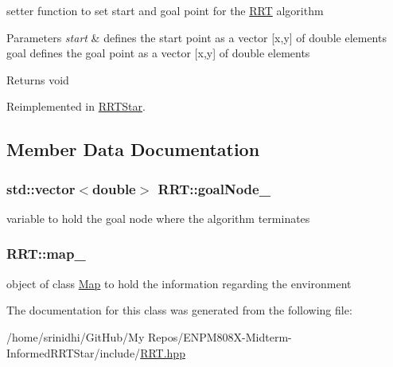 setter function to set start and goal point for the \hyperlink{classRRT}{R\+RT} algorithm 


\begin{DoxyParams}{Parameters}
{\em start} & defines the start point as a vector \mbox{[}x,y\mbox{]} of double elements goal defines the goal point as a vector \mbox{[}x,y\mbox{]} of double elements \\
\hline
\end{DoxyParams}
\begin{DoxyReturn}{Returns}
void 
\end{DoxyReturn}


Reimplemented in \hyperlink{classRRTStar_a1205f9b17419186be4a575151e68f304}{R\+R\+T\+Star}.



\subsection{Member Data Documentation}
\subsubsection[{\texorpdfstring{goal\+Node\+\_\+}{goalNode_}}]{\setlength{\rightskip}{0pt plus 5cm}std\+::vector$<$double$>$ R\+R\+T\+::goal\+Node\+\_\+}\hypertarget{classRRT_a01f224deb0e405704d56735301dca404}{}\label{classRRT_a01f224deb0e405704d56735301dca404}
variable to hold the goal node where the algorithm terminates 
\subsubsection[{\texorpdfstring{map\+\_\+}{map_}}]{ R\+R\+T\+::map\+\_\+}\hypertarget{classRRT_a534fd15ee26c5680a17ee3528a9e9b20}{}\label{classRRT_a534fd15ee26c5680a17ee3528a9e9b20}
object of class \hyperlink{classMap}{Map} to hold the information regarding the environment 

The documentation for this class was generated from the following file\+:\begin{DoxyCompactItemize}
\item 
/home/srinidhi/\+Git\+Hub/\+My Repos/\+E\+N\+P\+M808\+X-\/\+Midterm-\/\+Informed\+R\+R\+T\+Star/include/\hyperlink{RRT_8hpp}{R\+R\+T.\+hpp}\end{DoxyCompactItemize}
